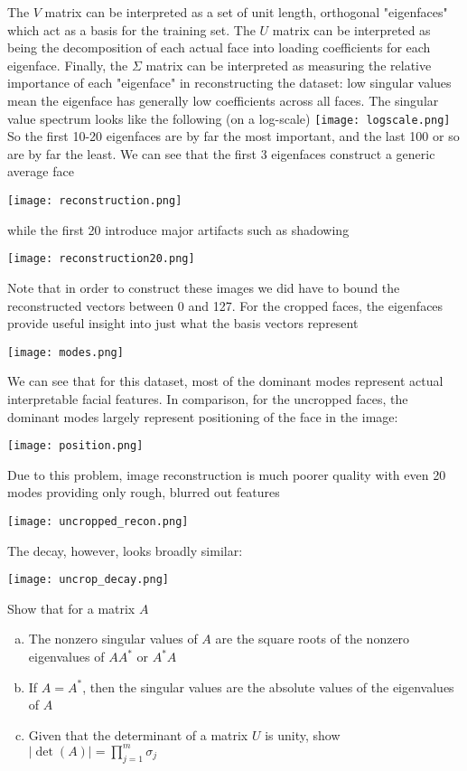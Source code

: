 \documentclass[letter, 12pt]{article}
\begin{document}
The $V$ matrix can be interpreted as a set of unit length, orthogonal "eigenfaces" which act as a basis for the training set. The $U$ matrix can be interpreted as being the decomposition of each actual face into loading coefficients for each eigenface. Finally, the $\Sigma$ matrix can be interpreted as measuring the relative importance of each "eigenface" in reconstructing the dataset: low singular values mean the eigenface has generally low coefficients across all faces. The singular value spectrum looks like the following (on a log-scale)
\texttt{[image: logscale.png]}
So the first 10-20 eigenfaces are by far the most important, and the last 100 or so are by far the least. We can see that the first 3 eigenfaces construct a generic average face
\begin{center}
\texttt{[image: reconstruction.png]}
\end{center}
while the first 20 introduce major artifacts such as shadowing
\begin{center}
\texttt{[image: reconstruction20.png]}
\end{center}
Note that in order to construct these images we did have to bound the reconstructed vectors between 0 and 127. For the cropped faces, the eigenfaces provide useful insight into just what the basis vectors represent
\begin{center}
\texttt{[image: modes.png]}
\end{center}
We can see that for this dataset, most of the dominant modes represent actual interpretable facial features. In comparison, for the uncropped faces, the dominant modes largely represent positioning of the face in the image:
\begin{center}
\texttt{[image: position.png]}
\end{center}
Due to this problem, image reconstruction is much poorer quality with even 20 modes providing only rough, blurred out features
\begin{center}
\texttt{[image: uncropped\_recon.png]}
\end{center}
The decay, however, looks broadly similar:
\begin{center}
\texttt{[image: uncrop\_decay.png]}
\end{center}

\pagebreak

\begin{problem}
Show that for a matrix $A$
\begin{enumerate}[(a)]
\item The nonzero singular values of $A$ are the square roots of the nonzero eigenvalues of $AA^*$ or $A^*A$
\item If $A=A^*$, then the singular values are the absolute values of the eigenvalues of $A$
\item Given that the determinant of a matrix $U$ is unity, show $|\det(A)|=\prod_{j=1}^m \sigma_j$
\end{enumerate}
\end{problem}
\end{document}

